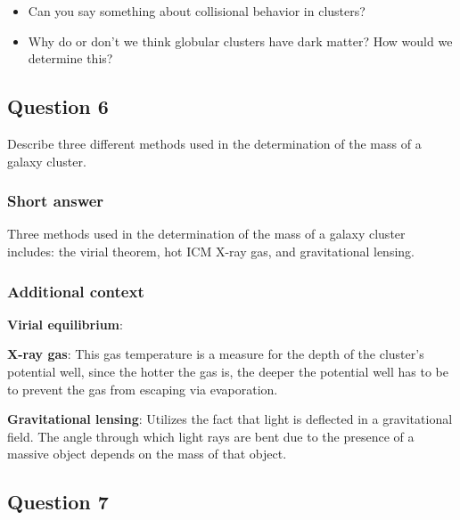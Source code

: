 \documentclass[a4paper,11pt]{article}
\begin{document}
\begin{itemize}
    \item Can you say something about collisional behavior in clusters?
    \item Why do or don't we think globular clusters have dark matter? How would we determine this? 
\end{itemize}


\newpage
\subsection{Question 6}

Describe three different methods used in the determination of the mass of a galaxy cluster.

\subsubsection{Short answer}

Three methods used in the determination of the mass of a galaxy cluster includes: the virial theorem, hot ICM X-ray gas, and gravitational lensing.

\subsubsection{Additional context} 

{\noindent}\textbf{Virial equilibrium}: 

{\noindent}\textbf{X-ray gas}: This gas temperature is a measure for the depth of the cluster's potential well, since the hotter the gas is, the deeper the potential well has to be to prevent the gas from escaping via evaporation.

{\noindent}\textbf{Gravitational lensing}: Utilizes the fact that light is deflected in a gravitational field. The angle through which light rays are bent due to the presence of a massive object depends on the mass of that object.


\newpage
\subsection{Question 7}
\end{document}
